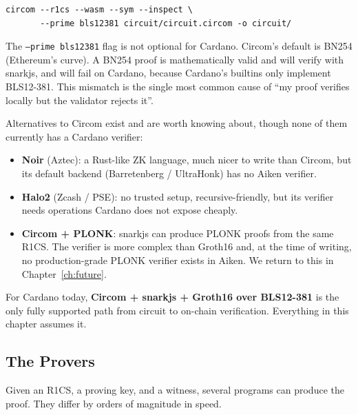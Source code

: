 \begin{verbatim}
circom --r1cs --wasm --sym --inspect \
       --prime bls12381 circuit/circuit.circom -o circuit/
\end{verbatim}

The \texttt{--prime bls12381} flag is not optional for Cardano. Circom's default
is BN254 (Ethereum's curve). A BN254 proof is mathematically valid and will
verify with snarkjs, and will fail on Cardano, because Cardano's builtins
only implement BLS12-381. This mismatch is the single most common cause of
``my proof verifies locally but the validator rejects it''.

Alternatives to Circom exist and are worth knowing about, though none of them
currently has a Cardano verifier:

\begin{itemize}
  \item \textbf{Noir} (Aztec): a Rust-like ZK language, much nicer to write
        than Circom, but its default backend (Barretenberg / UltraHonk) has no
        Aiken verifier.
  \item \textbf{Halo2} (Zcash / PSE): no trusted setup, recursive-friendly,
        but its verifier needs operations Cardano does not expose cheaply.
  \item \textbf{Circom + PLONK}: snarkjs can produce PLONK proofs from the
        same R1CS. The verifier is more complex than Groth16 and, at the time
        of writing, no production-grade PLONK verifier exists in Aiken.
        We return to this in Chapter~\ref{ch:future}.
\end{itemize}

\begin{remark}
For Cardano today, \textbf{Circom + snarkjs + Groth16 over BLS12-381} is the
only fully supported path from circuit to on-chain verification. Everything in
this chapter assumes it.
\end{remark}

\subsection*{The Provers}

Given an R1CS, a proving key, and a witness, several programs can produce the
proof. They differ by orders of magnitude in speed.

